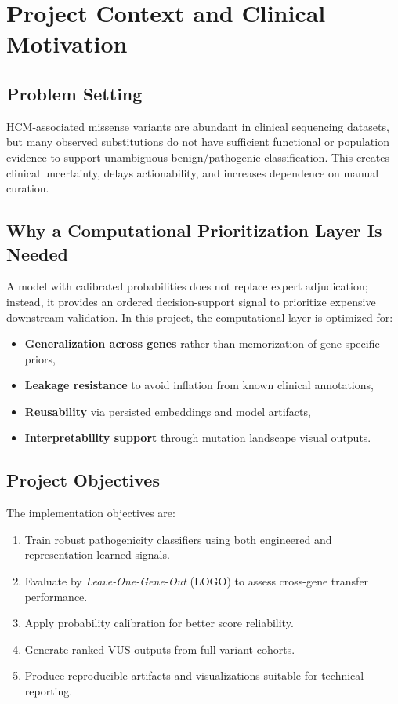 \documentclass[11pt,a4paper]{article}
\begin{document}
\section{Project Context and Clinical Motivation}
\subsection{Problem Setting}
HCM-associated missense variants are abundant in clinical sequencing datasets, but many observed substitutions do not have sufficient functional or population evidence to support unambiguous benign/pathogenic classification. This creates clinical uncertainty, delays actionability, and increases dependence on manual curation.

\subsection{Why a Computational Prioritization Layer Is Needed}
A model with calibrated probabilities does not replace expert adjudication; instead, it provides an ordered decision-support signal to prioritize expensive downstream validation. In this project, the computational layer is optimized for:
\begin{itemize}[leftmargin=1.2cm]
    \item \textbf{Generalization across genes} rather than memorization of gene-specific priors,
    \item \textbf{Leakage resistance} to avoid inflation from known clinical annotations,
    \item \textbf{Reusability} via persisted embeddings and model artifacts,
    \item \textbf{Interpretability support} through mutation landscape visual outputs.
\end{itemize}

\subsection{Project Objectives}
The implementation objectives are:
\begin{enumerate}[leftmargin=1.2cm]
    \item Train robust pathogenicity classifiers using both engineered and representation-learned signals.
    \item Evaluate by \textit{Leave-One-Gene-Out} (LOGO) to assess cross-gene transfer performance.
    \item Apply probability calibration for better score reliability.
    \item Generate ranked VUS outputs from full-variant cohorts.
    \item Produce reproducible artifacts and visualizations suitable for technical reporting.
\end{enumerate}
\end{document}
